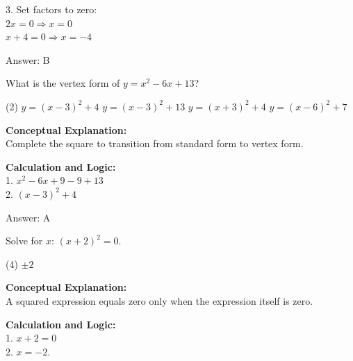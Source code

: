 \documentclass[11pt,paper=a4,answers]{exam}
\begin{document}
\begin{questions}
\begin{solution}
\vspace{10pt}

3. Set factors to zero: \\
   $2x = 0 \Rightarrow x = 0$ \\
   $x + 4 = 0 \Rightarrow x = -4$

\vspace{20pt}

Answer: \colorbox{yellow!100}{B}
\end{solution}

\vspace{30pt}

\question
What is the vertex form of $y = x^2 - 6x + 13$?
\begin{tasks}(2)
    \task $y = (x - 3)^2 + 4$
    \task $y = (x - 3)^2 + 13$
    \task $y = (x + 3)^2 + 4$
    \task $y = (x - 6)^2 + 7$
\end{tasks}

\begin{solution}
\textbf{Conceptual Explanation:} \\
Complete the square to transition from standard form to vertex form.

\vspace{15pt}

\textbf{Calculation and Logic:} \\
1. $x^2 - 6x + 9 - 9 + 13$ \\
2. $(x - 3)^2 + 4$

\vspace{20pt}

Answer: \colorbox{yellow!100}{A}
\end{solution}

\vspace{30pt}

\question
Solve for $x$: $(x + 2)^2 = 0$.
\begin{tasks}(4)
    \task $\pm 2$
\end{tasks}

\begin{solution}
\textbf{Conceptual Explanation:} \\
A squared expression equals zero only when the expression itself is zero.

\vspace{15pt}

\textbf{Calculation and Logic:} \\
1. $x + 2 = 0$ \\
2. $x = -2$.


\end{solution}
\end{questions}
\end{document}
